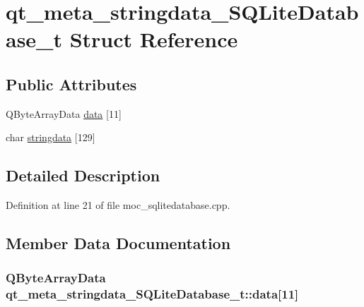 \hypertarget{structqt__meta__stringdata___s_q_lite_database__t}{}\section{qt\+\_\+meta\+\_\+stringdata\+\_\+\+S\+Q\+Lite\+Database\+\_\+t Struct Reference}
\label{structqt__meta__stringdata___s_q_lite_database__t}
\subsection*{Public Attributes}
\begin{DoxyCompactItemize}
\item 
Q\+Byte\+Array\+Data \hyperlink{structqt__meta__stringdata___s_q_lite_database__t_adeb82f35e0d47801f6c7773539b1161b}{data} \mbox{[}11\mbox{]}
\item 
char \hyperlink{structqt__meta__stringdata___s_q_lite_database__t_affb2d396b23558365cc0835d252a736d}{stringdata} \mbox{[}129\mbox{]}
\end{DoxyCompactItemize}


\subsection{Detailed Description}


Definition at line 21 of file moc\+\_\+sqlitedatabase.\+cpp.



\subsection{Member Data Documentation}
\hypertarget{structqt__meta__stringdata___s_q_lite_database__t_adeb82f35e0d47801f6c7773539b1161b}{}
\subsubsection[{data}]{\setlength{\rightskip}{0pt plus 5cm}Q\+Byte\+Array\+Data qt\+\_\+meta\+\_\+stringdata\+\_\+\+S\+Q\+Lite\+Database\+\_\+t\+::data\mbox{[}11\mbox{]}}\label{structqt__meta__stringdata___s_q_lite_database__t_adeb82f35e0d47801f6c7773539b1161b}


